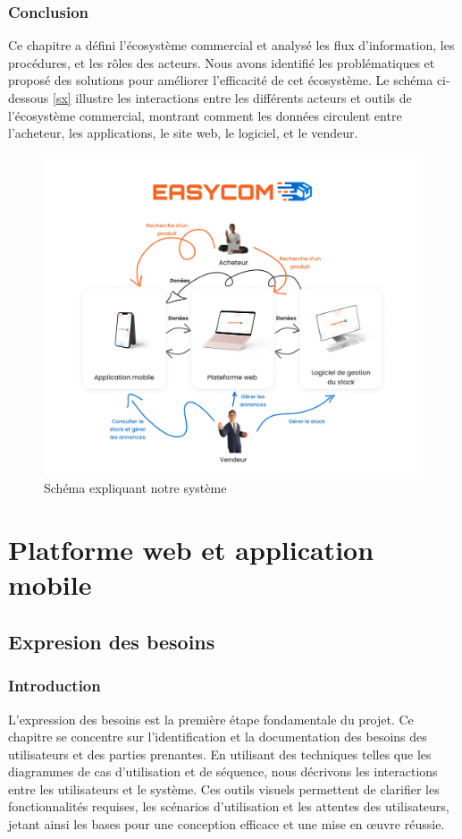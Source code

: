 \documentclass[edit,12pt,a4paper,ChapStyle,oneside,doubleinterligne]{report}
\begin{document}
\section{Conclusion}
Ce chapitre a défini l'écosystème commercial et analysé les flux d'information, les procédures, et les rôles des acteurs. Nous avons identifié les problématiques et proposé des solutions pour améliorer l'efficacité de cet écosystème.
\newline \newline
Le schéma ci-dessous \ref{sx} illustre les interactions entre les différents acteurs et outils de l'écosystème commercial, montrant comment les données circulent entre l'acheteur, les applications, le site web, le logiciel, et le vendeur.
\begin{figure}[h!]
    \centering
    \includegraphics[width=1\textwidth]{images/photo_2024-06-05_16-41-28.jpg}
    \caption{Schéma expliquant notre système}
\end{figure}\label{sx}



\part{Platforme web et application mobile}
\chapter{Expresion des besoins}  
\newpage
\section{Introduction }
L'expression des besoins est la première étape fondamentale du projet. Ce chapitre se concentre sur l'identification et la documentation des besoins des utilisateurs et des parties prenantes. En utilisant des techniques telles que les diagrammes de cas d'utilisation et de séquence, nous décrivons les interactions entre les utilisateurs et le système. Ces outils visuels permettent de clarifier les fonctionnalités requises, les scénarios d'utilisation et les attentes des utilisateurs, jetant ainsi les bases pour une conception efficace et une mise en œuvre réussie.
\end{document}
